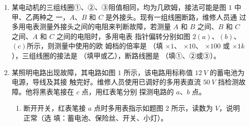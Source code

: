 \begin{enumerate}
\item
{}
某电动机的三组线圈①、②、③阻值相同，均为几欧姆，接法可能是图 $ 1 $ 中甲、乙两种之
一，$ A $、$ B $ 和 $ C $ 是外接头。现有一组线圈断路，维修人员通
过多用电表测量外接头之间的电阻来判断故障，若测量 $ A $
和 $ B $ 之间、$ B $ 和 $ C $ 之间、$ A $ 和 $ C $ 之间的电阻时，多用电表
指针偏转分别如图 $ 2(a) $、$ (b) $、$ (c) $所示，则测量中使用的欧
姆档的倍率是 \underlinegap （填 $ \times 1 $、 $ \times 10 $、 $ \times 100 $ 或 $ \times 1k $ ），三组线圈的接法是 \underlinegap （填甲或乙），断路线圈是 \underlinegap （填①、②或③）。
\begin{figure}[h!]
\centering
\begin{subfigure}{0.4\linewidth}
\centering
 
\caption{}\label{}
\end{subfigure}
\begin{subfigure}{0.8\linewidth}
\centering
 
\caption{}\label{}
\end{subfigure}
\end{figure}




\item 
{}
某照明电路出现故障，其电路如图 $ 1 $ 所示，该电路用标称值 $ 12 \ V $ 的蓄电池为电源，导线及其接
触完好。维修人员使用已调好的多用表直流 $ 50 \ V $ 挡检测故障。他将黑表笔接在 $ c $ 点，用红表笔分别
探测电路的 $ a $、$ b $ 点。
\begin{figure}[h!]
\centering
\begin{subfigure}{0.4\linewidth}
\centering
 
\caption{}\label{}
\end{subfigure}
\begin{subfigure}{0.4\linewidth}
\centering
 
\caption{}\label{}
\end{subfigure}

\end{figure}

\begin{enumerate}
\item
断开开关，红表笔接 $ a $ 点时多用表指示如题图 $ 2 $ 所示，读数为 \underlinegap 
$ V $，说明 \underlinegap 
正常（选
填：蓄电池、保险丝、开关、小灯）。



\end{enumerate}
\end{enumerate}
